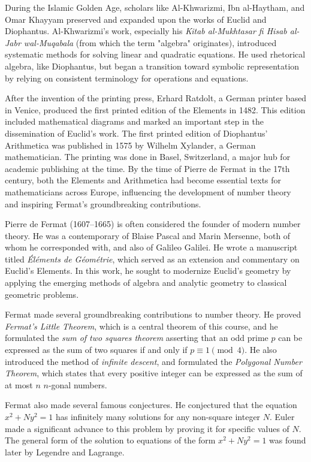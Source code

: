 \documentclass{article}
\theoremstyle{definition}
\theoremstyle{remark}
\begin{document}
During the Islamic Golden Age, scholars like Al-Khwarizmi, Ibn al-Haytham, and Omar Khayyam preserved and expanded upon the works of Euclid and Diophantus. Al-Khwarizmi’s work, especially his \emph{Kitab al-Mukhtasar fi Hisab al-Jabr wal-Muqabala} (from which the term "algebra" originates), introduced systematic methods for solving linear and quadratic equations. He used rhetorical algebra, like Diophantus, but began a transition toward symbolic representation by relying on consistent terminology for operations and equations.

After the invention of the printing press, Erhard Ratdolt, a German printer based in Venice, produced the first printed edition of the Elements in 1482. This edition included mathematical diagrams and marked an important step in the dissemination of Euclid’s work. The first printed edition of Diophantus' Arithmetica was published in 1575 by Wilhelm Xylander, a German mathematician. The printing was done in Basel, Switzerland, a major hub for academic publishing at the time. By the time of Pierre de Fermat in the 17th century, both the Elements and Arithmetica had become essential texts for mathematicians across Europe, influencing the development of number theory and inspiring Fermat’s groundbreaking contributions.

Pierre de Fermat (1607–1665) is often considered the founder of modern number theory. He was a contemporary of Blaise Pascal and Marin Mersenne, both of whom he corresponded with, and also of Galileo Galilei. He wrote a manuscript titled \emph{Éléments de Géométrie}, which served as an extension and commentary on Euclid’s Elements. In this work, he sought to modernize Euclid’s geometry by applying the emerging methods of algebra and analytic geometry to classical geometric problems.

Fermat made several groundbreaking contributions to number theory. He proved \emph{Fermat's Little Theorem}, which is a central theorem of this course, and he formulated the \emph{sum of two squares theorem} asserting that an odd prime $p$ can be expressed as the sum of two squares if and only if $p\equiv 1\pmod{4}$. He also introduced the method of \emph{infinite descent}, and formulated the \emph{Polygonal Number Theorem}, which states that every positive integer can be expressed as the sum of at most $n$ $n$-gonal numbers.

Fermat also made several famous conjectures. He conjectured that the equation $x^2+Ny^2=1$ has infinitely many solutions for any non-square integer $N$. Euler made a significant advance to this problem by proving it for specific values of $N$. The general form of the solution to equations of the form $x^2+Ny^2=1$ was found later by Legendre and Lagrange.
\end{document}

